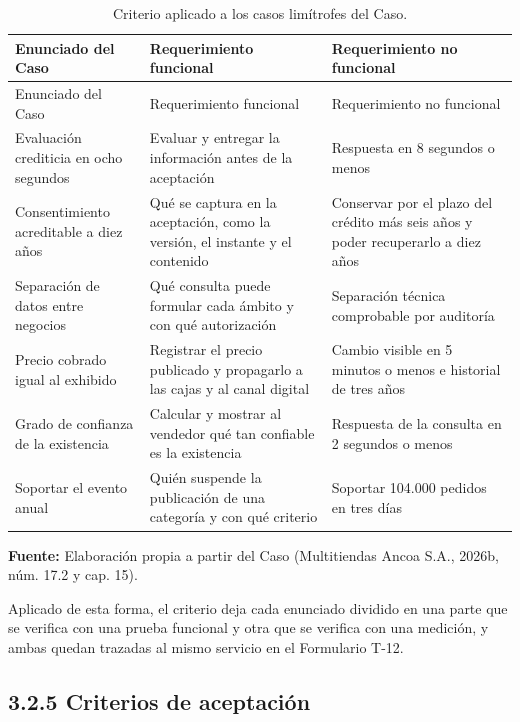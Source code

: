 \documentclass[11pt]{article}
\begin{document}
\begin{longtable}[]{@{}
  >{\raggedright\arraybackslash}p{}
  >{\raggedright\arraybackslash}p{}
  >{\raggedright\arraybackslash}p{}@{}}
\caption{Criterio aplicado a los casos limítrofes del Caso.}\label{tab:3-5}\\
\toprule\noalign{}
Enunciado del Caso & Requerimiento funcional & Requerimiento no funcional \\
\midrule\noalign{}
\endfirsthead
\toprule\noalign{}
Enunciado del Caso & Requerimiento funcional & Requerimiento no funcional \\
\midrule\noalign{}
\endhead
\bottomrule\noalign{}
\endlastfoot
Evaluación crediticia en ocho segundos & Evaluar y entregar la información antes de la aceptación & Respuesta en 8 segundos o menos \\
Consentimiento acreditable a diez años & Qué se captura en la aceptación, como la versión, el instante y el contenido & Conservar por el plazo del crédito más seis años y poder recuperarlo a diez años \\
Separación de datos entre negocios & Qué consulta puede formular cada ámbito y con qué autorización & Separación técnica comprobable por auditoría \\
Precio cobrado igual al exhibido & Registrar el precio publicado y propagarlo a las cajas y al canal digital & Cambio visible en 5 minutos o menos e historial de tres años \\
Grado de confianza de la existencia & Calcular y mostrar al vendedor qué tan confiable es la existencia & Respuesta de la consulta en 2 segundos o menos \\
Soportar el evento anual & Quién suspende la publicación de una categoría y con qué criterio & Soportar 104.000 pedidos en tres días \\
\end{longtable}

{\raggedright\textbf{Fuente:} Elaboración propia a partir del Caso (Multitiendas Ancoa S.A., 2026b, núm. 17.2 y cap. 15).\par}

Aplicado de esta forma, el criterio deja cada enunciado dividido en una parte que se verifica con una prueba funcional y otra que se verifica con una medición, y ambas quedan trazadas al mismo servicio en el Formulario T-12.

\subsection{3.2.5 Criterios de aceptación}
\end{document}
